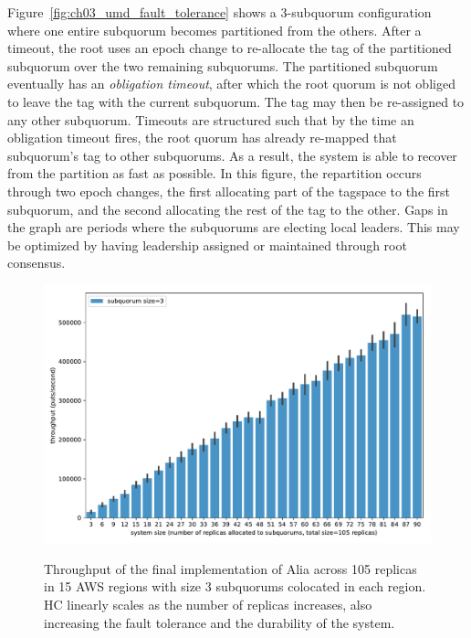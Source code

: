Figure~\ref{fig:ch03_umd_fault_tolerance} shows a 3-subquorum configuration where one entire subquorum becomes partitioned from the others.
After a timeout, the root uses an epoch change to re-allocate the tag of the partitioned subquorum over the two remaining subquorums.
The partitioned subquorum eventually has an \emph{obligation timeout}, after which the root quorum is not obliged to leave the tag with the current subquorum.
The tag may then be re-assigned to any other subquorum.
Timeouts are structured such that by the time an obligation timeout fires, the root quorum has already re-mapped that subquorum's tag to other subquorums.
As a result, the system is able to recover from the partition as fast as possible.
In this figure, the repartition occurs through two epoch changes, the first allocating part of the tagspace to the first subquorum, and the second allocating the rest of the tag to the other.
Gaps in the graph are periods where the subquorums are electing local leaders.
This may be optimized by having leadership assigned or maintained through root consensus.

\begin{figure}
    \begin{center}
        \includegraphics[width=5in]{figures/ch03_geoconsensus_total_throughput.pdf}
    \end{center}
    \renewcommand{\baselinestretch}{1}
    \small\normalsize

    \begin{quote}
        \caption[Planetary Scale HC Throughput]{Throughput of the final implementation of Alia across 105 replicas in 15 AWS regions with size 3 subquorums colocated in each region. HC linearly scales as the number of replicas increases, also increasing the fault tolerance and the durability of the system.}
        \label{fig:ch03_geoconsensus_total_throughput}
    \end{quote}
\end{figure}
\renewcommand{\baselinestretch}{2}
\small\normalsize

